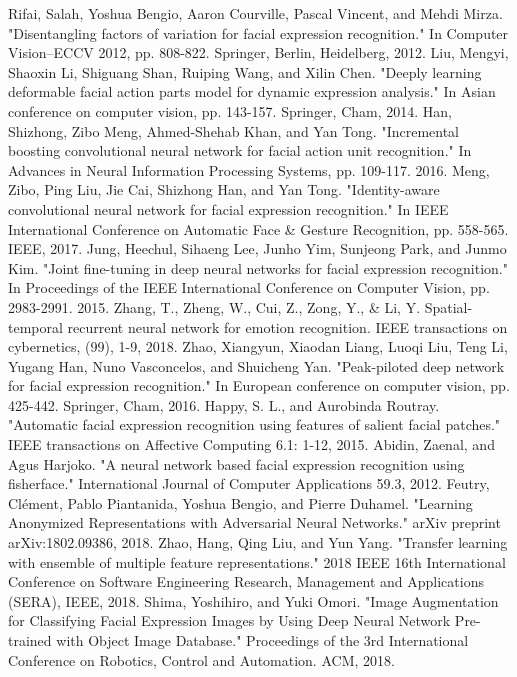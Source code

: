 \documentclass[conference]{IEEEtran}
\begin{document}
\begin{thebibliography}{1}
Rifai, Salah, Yoshua Bengio, Aaron Courville, Pascal Vincent, and Mehdi Mirza. "Disentangling factors of variation for facial expression recognition." In Computer Vision–ECCV 2012, pp. 808-822. Springer, Berlin, Heidelberg, 2012.
Liu, Mengyi, Shaoxin Li, Shiguang Shan, Ruiping Wang, and Xilin Chen. "Deeply learning deformable facial action parts model for dynamic expression analysis." In Asian conference on computer vision, pp. 143-157. Springer, Cham, 2014.
Han, Shizhong, Zibo Meng, Ahmed-Shehab Khan, and Yan Tong. "Incremental boosting convolutional neural network for facial action unit recognition." In Advances in Neural Information Processing Systems, pp. 109-117. 2016.
Meng, Zibo, Ping Liu, Jie Cai, Shizhong Han, and Yan Tong. "Identity-aware convolutional neural network for facial expression recognition." In IEEE International Conference on Automatic Face \& Gesture Recognition,  pp. 558-565. IEEE, 2017.
Jung, Heechul, Sihaeng Lee, Junho Yim, Sunjeong Park, and Junmo Kim. "Joint fine-tuning in deep neural networks for facial expression recognition." In Proceedings of the IEEE International Conference on Computer Vision, pp. 2983-2991. 2015.
Zhang, T., Zheng, W., Cui, Z., Zong, Y., \& Li, Y. Spatial-temporal recurrent neural network for emotion recognition. IEEE transactions on cybernetics, (99), 1-9, 2018.
Zhao, Xiangyun, Xiaodan Liang, Luoqi Liu, Teng Li, Yugang Han, Nuno Vasconcelos, and Shuicheng Yan. "Peak-piloted deep network for facial expression recognition." In European conference on computer vision, pp. 425-442. Springer, Cham, 2016.
Happy, S. L., and Aurobinda Routray. "Automatic facial expression recognition using features of salient facial patches." IEEE transactions on Affective Computing 6.1: 1-12, 2015.
Abidin, Zaenal, and Agus Harjoko. "A neural network based facial expression recognition using fisherface." International Journal of Computer Applications 59.3, 2012.
Feutry, Clément, Pablo Piantanida, Yoshua Bengio, and Pierre Duhamel. "Learning Anonymized Representations with Adversarial Neural Networks." arXiv preprint arXiv:1802.09386, 2018.
Zhao, Hang, Qing Liu, and Yun Yang. "Transfer learning with ensemble of multiple feature representations." 2018 IEEE 16th International Conference on Software Engineering Research, Management and Applications (SERA), IEEE, 2018.
Shima, Yoshihiro, and Yuki Omori. "Image Augmentation for Classifying Facial Expression Images by Using Deep Neural Network Pre-trained with Object Image Database." Proceedings of the 3rd International Conference on Robotics, Control and Automation. ACM, 2018.

\end{thebibliography}
\end{document}
